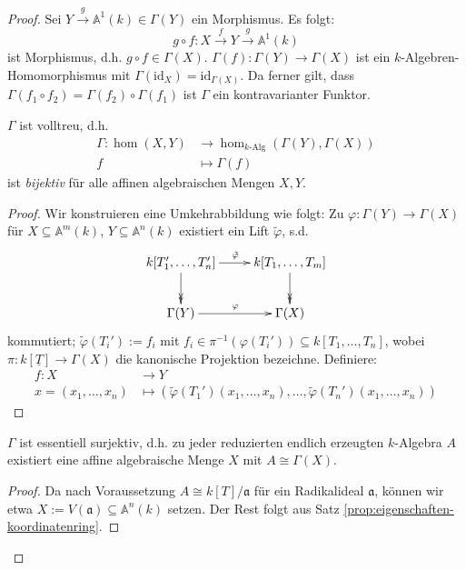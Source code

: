 \begin{proof}
  Sei $Y\xrightarrow{g}\mathbb{A}^{1}(k)\in\Gamma(Y)$ ein Morphismus. Es
  folgt:
  \[
    g\circ f:X\xrightarrow{f}Y\xrightarrow{g}\mathbb{A}^{1}(k)
  \] 
  ist Morphismus,  d.h. $g \circ f\in\Gamma(X)$. $\Gamma(f):\Gamma(Y)\rightarrow\Gamma(X)$
  ist ein $k$-Algebren-Homomorphismus mit $\Gamma(\text{id}_{X})=\text{id}_{\Gamma(X)}$. Da ferner gilt, dass $\Gamma(f_{1}\circ f_{2})=\Gamma(f_{2})\circ\Gamma(f_{1})$ ist $\Gamma$ ein kontravarianter Funktor.
  \begin{claim*}
    $\Gamma$ ist volltreu, d.h.
    \begin{align*}
      \Gamma:\hom(X,Y) & \rightarrow\hom_{k\text{-Alg}}(\Gamma(Y),\Gamma(X))\\
      f & \mapsto\Gamma(f)
    \end{align*}
    ist \emph{bijektiv} für alle affinen algebraischen Mengen $X,Y$.
  \end{claim*}
  \begin{proof}
    Wir konstruieren eine Umkehrabbildung wie folgt: Zu $\varphi:\Gamma(Y)\rightarrow\Gamma(X)$
    für $X\subseteq\mathbb{A}^{m}(k)$, $Y\subseteq\mathbb{A}^{n}(k)$ existiert ein Lift $\tilde\varphi$, s.d.
    \[
      \xymatrix{k[T_{1}',\ldots,T_{n}']\ar[r]^{\tilde{\varphi}}\ar@{->>}[d] & k[T_{1},\ldots,T_{m}]\ar@{->>}[d]\\
        \Gamma(Y)\ar[r]^{\varphi} & \Gamma(X)
      }
    \]
    kommutiert; $\tilde{\varphi}(T_{i}'):= f_i$ mit $f_i \in \pi^{-1}(\varphi(T_{i}')) \subseteq k[T_1,...,T_n]$, wobei $\pi : k[\underline{T}] \to \Gamma(X)$ die kanonische Projektion bezeichne. 
    Definiere:
    \begin{align*}
      f:X & \rightarrow Y\\
      x=(x_{1},\ldots,x_{n}) & \mapsto(\tilde{\varphi}(T_{1}')(x_{1},\ldots,x_{n}),\ldots,\tilde{\varphi}(T_{n}')(x_{1},\ldots,x_{n}))
    \end{align*}
  \end{proof}
  \begin{claim*}
    $\Gamma$ ist essentiell surjektiv, d.h. zu jeder reduzierten endlich
    erzeugten $k$-Algebra $A$ existiert eine affine algebraische Menge
    $X$ mit $A\cong\Gamma(X)$.
  \end{claim*}
  \begin{proof}
    Da nach Voraussetzung $A\cong k[T]/\mathfrak{a}$ für ein Radikalideal
    $\mathfrak{a}$, können wir etwa $X:=V(\mathfrak{a})\subseteq\mathbb{A}^{n}(k)$
    setzen. Der Rest folgt aus Satz \ref{prop:eigenschaften-koordinatenring}.
  \end{proof}
\end{proof}

